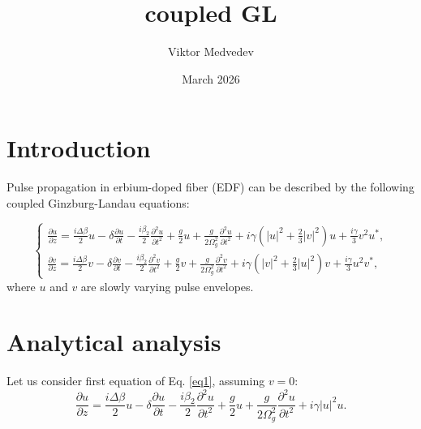 \documentclass{article}
\title{coupled GL}
\author{Viktor Medvedev}
\date{March 2026}
\begin{document}
\section{Introduction}
Pulse propagation in erbium-doped fiber (EDF) can be described by the following coupled Ginzburg-Landau equations:

\begin{equation} \label{eq1}
    \begin{cases}
        \displaystyle
        \frac{\partial{u}}{\partial{z}} = \frac{i \Delta \beta}{2}u - \delta \frac{\partial{u}}{\partial{t}} - \frac{i\beta_{2}}{2} \frac{\partial^2 u}{\partial t^2} + \frac{g}{2}u + \frac{g}{2\Omega^2_{g}}\frac{\partial^2 u}{\partial t^2} + i\gamma\left(\left|u\right|^2 + \frac{2}{3} \left|v\right|^2\right)u + \frac{i\gamma}{3}v^2 u^*, \\
        \displaystyle
        \frac{\partial{v}}{\partial{z}} = \frac{i \Delta \beta}{2}v - \delta \frac{\partial{v}}{\partial{t}} - \frac{i\beta_{2}}{2} \frac{\partial^2 v}{\partial t^2} + \frac{g}{2}v + \frac{g}{2\Omega^2_{g}}\frac{\partial^2 v}{\partial t^2} + i\gamma\left(\left|v\right|^2 + \frac{2}{3} \left|u\right|^2\right)v + \frac{i\gamma}{3}u^2 v^*,
    \end{cases}
\end{equation}
where \(u\) and \(v\) are slowly varying pulse envelopes.

\section{Analytical analysis}
\label{sec:analytical}
Let us consider first equation of Eq. \ref{eq1}, assuming \(v=0\):
\begin{equation} \label{eq2}
    \frac{\partial{u}}{\partial{z}} = \frac{i \Delta \beta}{2}u - \delta \frac{\partial{u}}{\partial{t}} - \frac{i\beta_{2}}{2} \frac{\partial^2 u}{\partial t^2} + \frac{g}{2}u + \frac{g}{2\Omega^2_{g}}\frac{\partial^2 u}{\partial t^2} + i\gamma\left|u\right|^2 u.
\end{equation}
\end{document}
